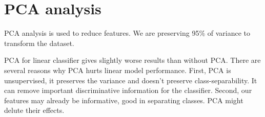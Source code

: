 \documentclass[conference]{IEEEtran}
\begin{document}
\section{PCA analysis}

PCA analysis is used to reduce features. 
We are preserving 95\% of variance to transform the dataset.



\begin{table}[h]
\centering
\caption{Linear model performance with PCA-reduced features.}
\label{tab:linear_model_pca}
\end{table}


PCA for linear classifier gives slightly worse results than without PCA.
There are several reasons why PCA hurts linear model performance. 
First, PCA is unsupervised, it preserves the variance and doesn't preserve class-separability.
It can remove important discriminative information for the classifier.
Second, our features may already be informative, good in separating classes.
PCA might delute their effects.

\end{document}
